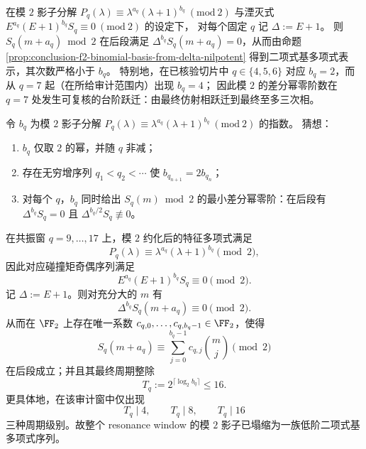 \begin{corollary}[模 \(2\) 影子差分阶数的台阶跃迁与碰撞矩奇偶动力学的可检验分级]\label{cor:conclusion-fold-collision-mod2-step-jump-q7}
在模 \(2\) 影子分解
\(
P_q(\lambda)\equiv \lambda^{a_q}(\lambda+1)^{b_q}\ (\mathrm{mod}\ 2)
\)
与湮灭式 \(E^{a_q}(E+1)^{b_q}S_q\equiv 0\ (\mathrm{mod}\ 2)\) 的设定下，
对每个固定 \(q\) 记 \(\Delta:=E+1\)。
则 \(S_q(m+a_q)\bmod 2\) 在后段满足 \(\Delta^{b_q}S_q(m+a_q)=0\)，从而由命题 \ref{prop:conclusion-f2-binomial-basis-from-delta-nilpotent} 得到二项式基多项式表示，其次数严格小于 \(b_q\)。
特别地，在已核验切片中 \(q\in\{4,5,6\}\) 对应 \(b_q=2\)，而从 \(q=7\) 起（在所给审计范围内）出现 \(b_q=4\)；
因此模 \(2\) 的差分幂零阶数在 \(q=7\) 处发生可复核的台阶跃迁：由最终仿射相跃迁到最终至多三次相。
\end{corollary}

\begin{conjecture}\label{conj:conclusion-fold-collision-mod2-power-tower}
令 \(b_q\) 为模 \(2\) 影子分解 \(P_q(\lambda)\equiv \lambda^{a_q}(\lambda+1)^{b_q}\ (\mathrm{mod}\ 2)\) 的指数。
猜想：
\begin{enumerate}
  \item \(b_q\) 仅取 \(2\) 的幂，并随 \(q\) 非减；
  \item 存在无穷增序列 \(q_1<q_2<\cdots\) 使 \(b_{q_{n+1}}=2b_{q_n}\)；
  \item 对每个 \(q\)，\(b_q\) 同时给出 \(S_q(m)\bmod 2\) 的最小差分幂零阶：在后段有 \(\Delta^{b_q}S_q=0\) 且 \(\Delta^{b_q/2}S_q\not\equiv 0\)。
\end{enumerate}
\end{conjecture}

\begin{theorem}\label{thm:conclusion-resonance-window-mod2-binomial-collapse}
在共振窗 \(q=9,\dots,17\) 上，模 \(2\) 约化后的特征多项式满足
\[
P_q(\lambda)\equiv \lambda^{a_q}(\lambda+1)^{b_q}\pmod 2,
\]
因此对应碰撞矩奇偶序列满足
\[
E^{a_q}(E+1)^{b_q}S_q\equiv 0\pmod 2.
\]
记 \(\Delta:=E+1\)。则对充分大的 \(m\) 有
\[
\Delta^{b_q}S_q(m+a_q)\equiv 0\pmod 2.
\]
从而在 \(\FF_2\) 上存在唯一系数 \(c_{q,0},\dots,c_{q,b_q-1}\in\FF_2\)，使得
\[
S_q(m+a_q)\equiv \sum_{j=0}^{b_q-1}c_{q,j}\binom{m}{j}\pmod 2
\]
在后段成立；并且其最终周期整除
\[
T_q:=2^{\lceil\log_2 b_q\rceil}\le 16.
\]
更具体地，在该审计窗中仅出现
\[
T_q\mid 4,\qquad T_q\mid 8,\qquad T_q\mid 16
\]
三种周期级别。故整个 resonance window 的模 \(2\) 影子已塌缩为一族低阶二项式基多项式序列。
\end{theorem}


